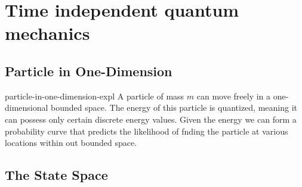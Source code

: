 \documentclass[preview]{standalone}
\begin{document}
\genpage

\section{Time independent quantum mechanics}


\subsection{Particle in One-Dimension}

\begin{snippet}{particle-in-one-dimension-expl}
    A particle of mass \(m\) can move freely in a one-dimensional bounded space.
    The energy of this particle is quantized, meaning it can possess only certain discrete energy values.
    Given the energy we can form a probability curve that predicts the likelihood of fnding the particle at various locations within out bounded space.
\end{snippet}

\subsection{The State Space}
\end{document}
